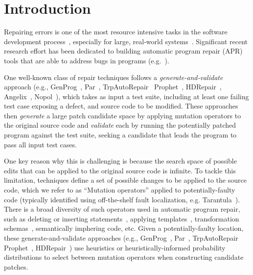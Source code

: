 \documentclass[conference]{IEEEtran}
\begin{document}
\section{Introduction} \label{introduction}

Repairing errors is one of the most 
resource intensive tasks in 
the software development process~\cite{Weiss07,Tassey02,Britton13}, especially for large, real-world systems~\cite{Liblit03,Anvik05}.
%
Significant recent research effort has been dedicated to
building automatic program repair (APR) tools that are able to address
bugs in 
programs (e.g.~\cite{legoues12,kim2013,Weimer13,long15SPR,long16proph,debroy10,perkins09,wei10}).

One well-known class of repair techniques follows a 
\emph{generate-and-validate} approach (e.g., GenProg~\cite{legoues12}, 
Par~\cite{kim2013}, TrpAutoRepair~\cite{Qi13TrpAutoR}
Prophet~\cite{long16proph}, HDRepair~\cite{xuan16}, Angelix~\cite{Mechtaev2016},
Nopol~\cite{xuanNopol}), which takes as input a test suite, 
including at
least one failing test case exposing
a defect, and source code to be 
modified.  These approaches then \emph{generate} a large patch candidate space 
by applying 
mutation operators to the original source code and \emph{validate} each by
running the potentially patched program against the test suite, seeking a candidate that
leads the program to pass all input test cases. 

One key reason why this is challenging is because the search space of possible edits that can be applied to the original source code is infinite. To tackle this limitation, techniques define a set of possible changes to be
applied to the source code, which we refer to as ``Mutation operators'' applied to potentially-faulty code (typically identified using off-the-shelf fault 
localization, e.g. Tarantula~\cite{Jones02}). 
There is a broad diversity of such operators used in automatic program repair, such as deleting or inserting 
statements~\cite{legoues12}, applying templates~\cite{kim2013}, transformation 
schemas~\cite{long16proph,long15SPR}, semantically imphering code\cite{nguyen13,Mechtaev2016,xuanNopol}, etc.
Given a potentially-faulty location, these
generate-and-validate approaches (e.g., GenProg~\cite{legoues12}, 
Par~\cite{kim2013}, TrpAutoRepair~\cite{Qi13TrpAutoR}
Prophet~\cite{long16proph}, HDRepair~\cite{xuan16}) use heuristics or
heuristically-informed probability distributions to select between
mutation operators
when constructing candidate patches.
\end{document}
